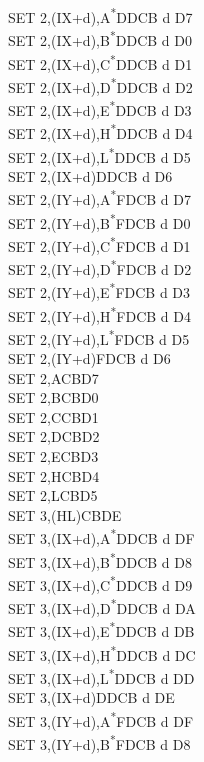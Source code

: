 \documentclass[twoside,openright,a4paper]{book}
\begin{document}
\begin{multicols}{3}
{\begin{tabbing}
	SET 2,(IX+d),A\textsuperscript{*}\>DDCB d D7\\
	SET 2,(IX+d),B\textsuperscript{*}\>DDCB d D0\\
	SET 2,(IX+d),C\textsuperscript{*}\>DDCB d D1\\
	SET 2,(IX+d),D\textsuperscript{*}\>DDCB d D2\\
	SET 2,(IX+d),E\textsuperscript{*}\>DDCB d D3\\
	SET 2,(IX+d),H\textsuperscript{*}\>DDCB d D4\\
	SET 2,(IX+d),L\textsuperscript{*}\>DDCB d D5\\
	SET 2,(IX+d)\>DDCB d D6\\
	SET 2,(IY+d),A\textsuperscript{*}\>FDCB d D7\\
	SET 2,(IY+d),B\textsuperscript{*}\>FDCB d D0\\
	SET 2,(IY+d),C\textsuperscript{*}\>FDCB d D1\\
	SET 2,(IY+d),D\textsuperscript{*}\>FDCB d D2\\
	SET 2,(IY+d),E\textsuperscript{*}\>FDCB d D3\\
	SET 2,(IY+d),H\textsuperscript{*}\>FDCB d D4\\
	SET 2,(IY+d),L\textsuperscript{*}\>FDCB d D5\\
	SET 2,(IY+d)\>FDCB d D6\\
	SET 2,A\>CBD7\\
	SET 2,B\>CBD0\\
	SET 2,C\>CBD1\\
	SET 2,D\>CBD2\\
	SET 2,E\>CBD3\\
	SET 2,H\>CBD4\\
	SET 2,L\>CBD5\\
	SET 3,(HL)\>CBDE\\
	SET 3,(IX+d),A\textsuperscript{*}\>DDCB d DF\\
	SET 3,(IX+d),B\textsuperscript{*}\>DDCB d D8\\
	SET 3,(IX+d),C\textsuperscript{*}\>DDCB d D9\\
	SET 3,(IX+d),D\textsuperscript{*}\>DDCB d DA\\
	SET 3,(IX+d),E\textsuperscript{*}\>DDCB d DB\\
	SET 3,(IX+d),H\textsuperscript{*}\>DDCB d DC\\
	SET 3,(IX+d),L\textsuperscript{*}\>DDCB d DD\\
	SET 3,(IX+d)\>DDCB d DE\\
	SET 3,(IY+d),A\textsuperscript{*}\>FDCB d DF\\
	SET 3,(IY+d),B\textsuperscript{*}\>FDCB d D8\\

\end{tabbing}}
\end{multicols}
\end{document}
